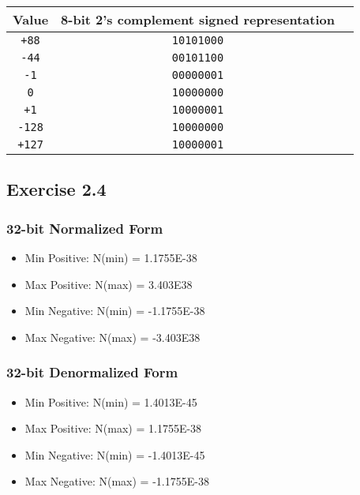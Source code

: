 \documentclass{article}
\begin{document}
\begin{tabular}{|c|c|p{4.2in}|}
  \hline
  Value & 8-bit 2’s complement signed
representation \\
  \hline
  \hline
  \texttt{+88} & \texttt{10101000}  \\
  \hline
  \texttt{-44} & \texttt{00101100} \\
  \hline
  \texttt{-1} & \texttt{00000001} \\
  \hline
  \texttt{0} & \texttt{10000000} \\
  \hline
  \texttt{+1} & \texttt{10000001} \\
  \hline
  \texttt{-128} & \texttt{10000000} \\
  \hline
  \texttt{+127} & \texttt{10000001} \\
  \hline
  \end{tabular}
 
\newpage

\subsection{Exercise 2.4}

\subsubsection{32-bit Normalized Form}

\begin{itemize}
    \item{Min Positive: N(min) = 1.1755E-38}
    \item{Max Positive: N(max) = 3.403E38}
    \item{Min Negative: N(min) = -1.1755E-38}
    \item{Max Negative: N(max) = -3.403E38}
\end{itemize}

\subsubsection{32-bit Denormalized Form}

\begin{itemize}
    \item{Min Positive: N(min) = 1.4013E-45}
    \item{Max Positive: N(max) = 1.1755E-38}
    \item{Min Negative: N(min) = -1.4013E-45}
    \item{Max Negative: N(max) = -1.1755E-38}
\end{itemize}
\end{document}
